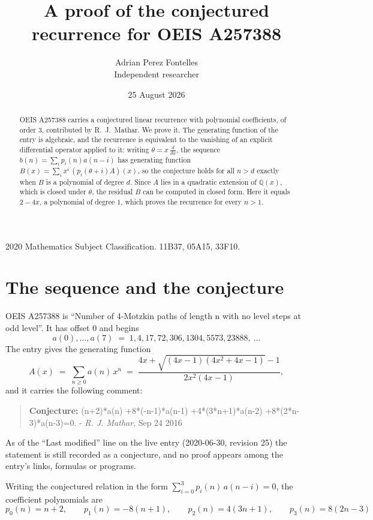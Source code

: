 \documentclass[11pt,a4paper]{article}
\title{A proof of the conjectured recurrence for OEIS A257388}
\author{Adrian Perez Fontelles\\ \small Independent researcher}
\date{25 August 2026}
\theoremstyle{plain}
\theoremstyle{definition}
\begin{document}
\maketitle

\begin{abstract}
OEIS A257388 carries a conjectured linear recurrence with polynomial coefficients, of
order 3, contributed by R.~J.~Mathar. We prove it. The generating function of the
entry is algebraic, and the recurrence is equivalent to the vanishing of an explicit
differential operator applied to it: writing $\theta=x\,\frac{d}{dx}$, the sequence
$b(n)=\sum_{i}p_{i}(n)a(n-i)$ has generating function
$B(x)=\sum_{i}x^{i}\,(p_{i}(\theta+i)A)(x)$, so the conjecture holds for all $n>d$ exactly
when $B$ is a polynomial of degree $d$. Since $A$ lies in a quadratic extension of
$\mathbb{Q}(x)$, which is closed under $\theta$, the residual $B$ can be computed in
closed form. Here it equals $2 - 4 x$, a polynomial of degree $1$, which proves
the recurrence for every $n>1$.
\end{abstract}

\noindent\small 2020 Mathematics Subject Classification. 11B37, 05A15, 33F10.\normalsize

\section{The sequence and the conjecture}

OEIS A257388 is ``Number of 4-Motzkin paths of length n with no level steps at odd level''. It has offset $0$ and begins
\[
a(0),\dots,a(7)\;=\;1, 4, 17, 72, 306, 1304, 5573, 23888,\ \dots
\]
The entry gives the generating function
\begin{equation}\label{eq:gf}
A(x)\;=\;\sum_{n\ge 0} a(n)\,x^{n}\;=\;\frac{4 x + \sqrt{\left(4 x - 1\right) \left(4 x^{2} + 4 x - 1\right)} - 1}{2 x^{2} \left(4 x - 1\right)} ,
\end{equation}
and it carries the following comment:
\begin{quote}\small
\textbf{Conjecture:} (n+2)*a(n) +8*(-n-1)*a(n-1) +4*(3*n+1)*a(n-2) +8*(2*n-3)*a(n-3)=0. - \emph{R. J. Mathar}, Sep 24 2016
\end{quote}
As of the ``Last modified'' line on the live entry (2020-06-30, revision 25) the
statement is still recorded as a conjecture, and no proof appears among the entry's links,
formulas or programs.

Writing the conjectured relation in the form $\sum_{i=0}^{3}p_{i}(n)\,a(n-i)=0$,
the coefficient polynomials are
\[
p_{0}(n)=n + 2,\qquad p_{1}(n)=- 8 \left(n + 1\right),\qquad p_{2}(n)=4 \left(3 n + 1\right),\qquad p_{3}(n)=8 \left(2 n - 3\right)
\]
\end{document}
